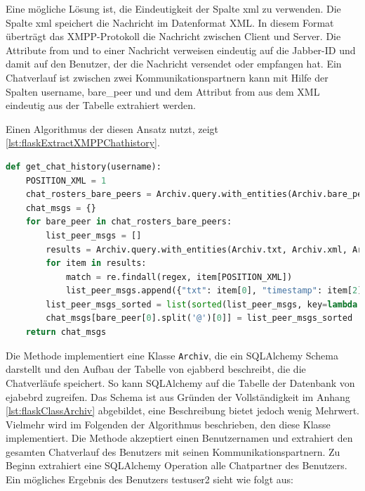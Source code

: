 \documentclass[a4paper,titlepage,halfparskip,12pt]{scrreprt}
\begin{document}
\begin{onehalfspacing}
Eine mögliche Lösung ist, die Eindeutigkeit der Spalte xml zu verwenden. Die Spalte xml speichert die Nachricht im Datenformat \acs{XML}. In diesem Format überträgt das \acs{XMPP}-Protokoll die Nachricht zwischen Client und Server. Die Attribute from und to einer Nachricht verweisen eindeutig auf die Jabber-ID und damit auf den Benutzer, der die Nachricht versendet oder empfangen hat. Ein Chatverlauf ist zwischen zwei Kommunikationspartnern kann mit Hilfe der Spalten username, bare\_peer und und dem Attribut from aus dem \acs{XML} eindeutig aus der Tabelle extrahiert werden.

Einen Algorithmus der diesen Ansatz nutzt, zeigt \autoref{lst:flaskExtractXMPPChathistory}.

\begin{lstlisting}[language=python, caption={Code für die Generierung des Chatverlaufes von ejabberd}, label={lst:flaskExtractXMPPChathistory}]
def get_chat_history(username):
    POSITION_XML = 1
    chat_rosters_bare_peers = Archiv.query.with_entities(Archiv.bare_peer).filter_by(username=username).group_by("bare_peer").all()
    chat_msgs = {}
    for bare_peer in chat_rosters_bare_peers:
        list_peer_msgs = []
        results = Archiv.query.with_entities(Archiv.txt, Archiv.xml, Archiv.created_at, Archiv.kind).filter_by(username=username).filter_by(bare_peer=bare_peer[0]).all()
        for item in results:
            match = re.findall(regex, item[POSITION_XML])
            list_peer_msgs.append({"txt": item[0], "timestamp": item[2].strftime('%Y-%m-%d %H:%M:%S'), "type": item[3], "from": match[0]})
        list_peer_msgs_sorted = list(sorted(list_peer_msgs, key=lambda k: k["timestamp"]))
        chat_msgs[bare_peer[0].split('@')[0]] = list_peer_msgs_sorted
    return chat_msgs
\end{lstlisting}

Die Methode implementiert eine Klasse \texttt{Archiv}, die ein SQLAlchemy Schema darstellt und den Aufbau der Tabelle von ejabberd beschreibt, die die Chatverläufe speichert. So kann SQLAlchemy auf die Tabelle der Datenbank von ejabebrd zugreifen. Das Schema ist aus Gründen der Vollständigkeit im Anhang \autoref{lst:flaskClassArchiv} abgebildet, eine Beschreibung bietet jedoch wenig Mehrwert. Vielmehr wird im Folgenden der Algorithmus beschrieben, den diese Klasse implementiert.
Die Methode akzeptiert einen Benutzernamen und extrahiert den gesamten Chatverlauf des Benutzers mit seinen Kommunikationspartnern. Zu Beginn extrahiert eine SQLAlchemy Operation alle Chatpartner des Benutzers.
Ein mögliches Ergebnis des Benutzers testuser2 sieht wie folgt aus:


\end{onehalfspacing}
\end{document}

